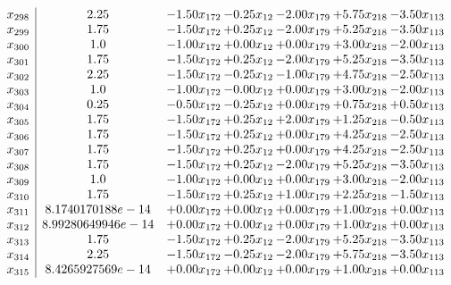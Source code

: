 \documentclass[8pt]{article}
\begin{document}
\[\begin{array}{c| c c@{\hskip 2pt} c@{\hskip 2pt} c@{\hskip 2pt} c@{\hskip 2pt} c@{\hskip 2pt} }
 x_{298}   &  2.25 & -1.50 x_{172} & -0.25 x_{12} & -2.00 x_{179} & +  5.75 x_{218} & -3.50 x_{113}\\
 x_{299}   &  1.75 & -1.50 x_{172} & +  0.25 x_{12} & -2.00 x_{179} & +  5.25 x_{218} & -3.50 x_{113}\\
 x_{300}   &  1.0 & -1.00 x_{172} & +  0.00 x_{12} & +  0.00 x_{179} & +  3.00 x_{218} & -2.00 x_{113}\\
 x_{301}   &  1.75 & -1.50 x_{172} & +  0.25 x_{12} & -2.00 x_{179} & +  5.25 x_{218} & -3.50 x_{113}\\
 x_{302}   &  2.25 & -1.50 x_{172} & -0.25 x_{12} & -1.00 x_{179} & +  4.75 x_{218} & -2.50 x_{113}\\
 x_{303}   &  1.0 & -1.00 x_{172} & -0.00 x_{12} & +  0.00 x_{179} & +  3.00 x_{218} & -2.00 x_{113}\\
 x_{304}   &  0.25 & -0.50 x_{172} & -0.25 x_{12} & +  0.00 x_{179} & +  0.75 x_{218} & +  0.50 x_{113}\\
 x_{305}   &  1.75 & -1.50 x_{172} & +  0.25 x_{12} & +  2.00 x_{179} & +  1.25 x_{218} & -0.50 x_{113}\\
 x_{306}   &  1.75 & -1.50 x_{172} & +  0.25 x_{12} & +  0.00 x_{179} & +  4.25 x_{218} & -2.50 x_{113}\\
 x_{307}   &  1.75 & -1.50 x_{172} & +  0.25 x_{12} & +  0.00 x_{179} & +  4.25 x_{218} & -2.50 x_{113}\\
 x_{308}   &  1.75 & -1.50 x_{172} & +  0.25 x_{12} & -2.00 x_{179} & +  5.25 x_{218} & -3.50 x_{113}\\
 x_{309}   &  1.0 & -1.00 x_{172} & +  0.00 x_{12} & +  0.00 x_{179} & +  3.00 x_{218} & -2.00 x_{113}\\
 x_{310}   &  1.75 & -1.50 x_{172} & +  0.25 x_{12} & +  1.00 x_{179} & +  2.25 x_{218} & -1.50 x_{113}\\
 x_{311}   &  8.1740170188e-14 & +  0.00 x_{172} & +  0.00 x_{12} & +  0.00 x_{179} & +  1.00 x_{218} & +  0.00 x_{113}\\
 x_{312}   &  8.99280649946e-14 & +  0.00 x_{172} & +  0.00 x_{12} & +  0.00 x_{179} & +  1.00 x_{218} & +  0.00 x_{113}\\
 x_{313}   &  1.75 & -1.50 x_{172} & +  0.25 x_{12} & -2.00 x_{179} & +  5.25 x_{218} & -3.50 x_{113}\\
 x_{314}   &  2.25 & -1.50 x_{172} & -0.25 x_{12} & -2.00 x_{179} & +  5.75 x_{218} & -3.50 x_{113}\\
 x_{315}   &  8.4265927569e-14 & +  0.00 x_{172} & +  0.00 x_{12} & +  0.00 x_{179} & +  1.00 x_{218} & +  0.00 x_{113}\\

\end{array}\]
\end{document}
